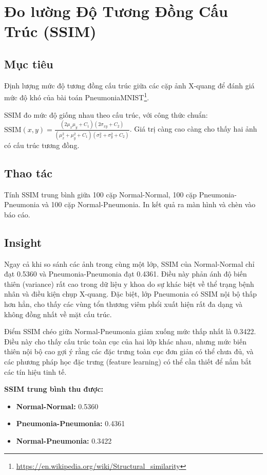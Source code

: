 \documentclass[a4paper,12pt]{report}
\begin{document}
\section{Đo lường Độ Tương Đồng Cấu Trúc (SSIM)}
\subsection{Mục tiêu}
Định lượng mức độ tương đồng cấu trúc giữa các cặp ảnh X-quang để đánh giá mức độ khó của bài toán PneumoniaMNIST\footnote{\url{https://en.wikipedia.org/wiki/Structural_similarity}}.

SSIM đo mức độ giống nhau theo cấu trúc, với công thức chuẩn: $\mathrm{SSIM}(x,y)=\frac{(2\mu_x\mu_y + C_1)(2\sigma_{xy} + C_2)}{(\mu_x^2 + \mu_y^2 + C_1)(\sigma_x^2 + \sigma_y^2 + C_2)}$. Giá trị càng cao càng cho thấy hai ảnh có cấu trúc tương đồng.

\subsection{Thao tác}
Tính SSIM trung bình giữa 100 cặp Normal-Normal, 100 cặp Pneumonia-Pneumonia và 100 cặp Normal-Pneumonia. In kết quả ra màn hình và chèn vào báo cáo.

\subsection{Insight}
Ngay cả khi so sánh các ảnh trong cùng một lớp, SSIM của Normal-Normal chỉ đạt 0.5360 và Pneumonia-Pneumonia đạt 0.4361. Điều này phản ánh độ biến thiên (variance) rất cao trong dữ liệu y khoa do sự khác biệt về thể trạng bệnh nhân và điều kiện chụp X-quang. Đặc biệt, lớp Pneumonia có SSIM nội bộ thấp hơn hẳn, cho thấy các vùng tổn thương viêm phổi xuất hiện rất đa dạng và không đồng nhất về mặt cấu trúc.

Điểm SSIM chéo giữa Normal-Pneumonia giảm xuống mức thấp nhất là 0.3422. Điều này cho thấy cấu trúc toàn cục của hai lớp khác nhau, nhưng mức biến thiên nội bộ cao gợi ý rằng các đặc trưng toàn cục đơn giản có thể chưa đủ, và các phương pháp học đặc trưng (feature learning) có thể cần thiết để nắm bắt các tín hiệu tinh tế.

\textbf{SSIM trung bình thu được:}
\begin{itemize}
    \item \textbf{Normal-Normal:} 0.5360
    \item \textbf{Pneumonia-Pneumonia:} 0.4361
    \item \textbf{Normal-Pneumonia:} 0.3422
\end{itemize}
\end{document}
